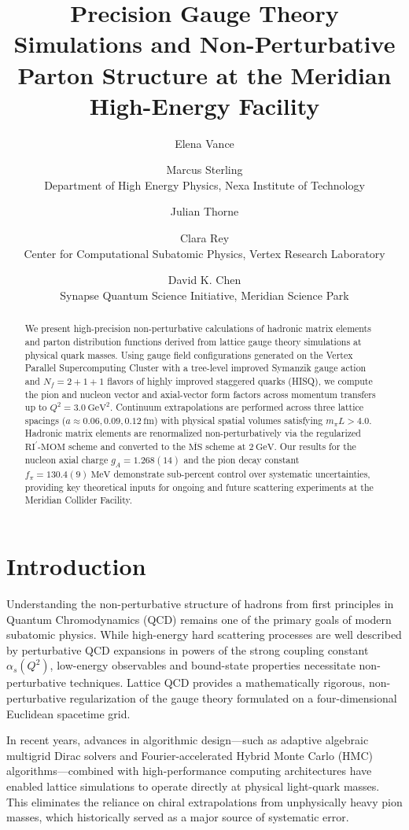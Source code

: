 \documentclass{proc}
\title{Precision Gauge Theory Simulations and Non-Perturbative Parton Structure at the Meridian High-Energy Facility}
\author{Elena Vance \and Marcus Sterling \\
Department of High Energy Physics, Nexa Institute of Technology \\
\and
Julian Thorne \and Clara Rey \\
Center for Computational Subatomic Physics, Vertex Research Laboratory \\
\and
David K. Chen \\
Synapse Quantum Science Initiative, Meridian Science Park}
\begin{document}
\maketitle

\begin{abstract}
We present high-precision non-perturbative calculations of hadronic matrix elements and parton distribution functions derived from lattice gauge theory simulations at physical quark masses. Using gauge field configurations generated on the Vertex Parallel Supercomputing Cluster with a tree-level improved Symanzik gauge action and $N_f = 2+1+1$ flavors of highly improved staggered quarks (HISQ), we compute the pion and nucleon vector and axial-vector form factors across momentum transfers up to $Q^2 = 3.0~\text{GeV}^2$. Continuum extrapolations are performed across three lattice spacings ($a \approx 0.06, 0.09, 0.12~\text{fm}$) with physical spatial volumes satisfying $m_\pi L > 4.0$. Hadronic matrix elements are renormalized non-perturbatively via the regularized $\text{RI}^\prime\text{-MOM}$ scheme and converted to the $\overline{\text{MS}}$ scheme at $2~\text{GeV}$. Our results for the nucleon axial charge $g_A = 1.268(14)$ and the pion decay constant $f_\pi = 130.4(9)~\text{MeV}$ demonstrate sub-percent control over systematic uncertainties, providing key theoretical inputs for ongoing and future scattering experiments at the Meridian Collider Facility.
\end{abstract}

\section{Introduction}
Understanding the non-perturbative structure of hadrons from first principles in Quantum Chromodynamics (QCD) remains one of the primary goals of modern subatomic physics. While high-energy hard scattering processes are well described by perturbative QCD expansions in powers of the strong coupling constant $\alpha_s(Q^2)$, low-energy observables and bound-state properties necessitate non-perturbative techniques. Lattice QCD provides a mathematically rigorous, non-perturbative regularization of the gauge theory formulated on a four-dimensional Euclidean spacetime grid.

In recent years, advances in algorithmic design---such as adaptive algebraic multigrid Dirac solvers and Fourier-accelerated Hybrid Monte Carlo (HMC) algorithms---combined with high-performance computing architectures have enabled lattice simulations to operate directly at physical light-quark masses. This eliminates the reliance on chiral extrapolations from unphysically heavy pion masses, which historically served as a major source of systematic error.
\end{document}

